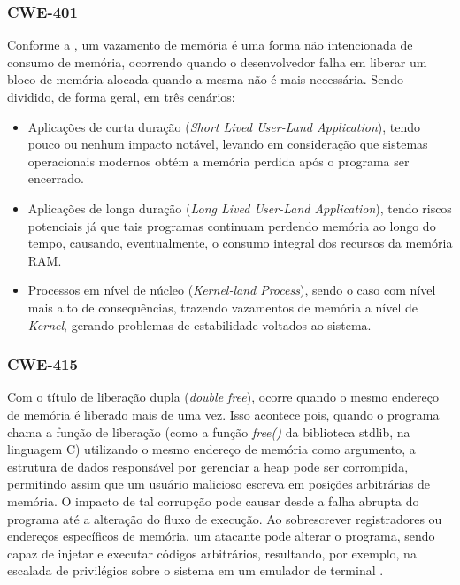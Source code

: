 \documentclass[
    12pt,                %
    openright,           %
    oneside,             %
    a4paper,             %
    english,             %
    brazil               %
]{abntex2}
\begin{document}
\subsubsection{CWE-401}
\label{subsec:cwe401}

Conforme a , um vazamento de memória é uma forma não intencionada de consumo de memória, ocorrendo quando o desenvolvedor falha em liberar um bloco de memória alocada quando a mesma não é mais necessária. Sendo dividido, 
de forma geral, em três cenários:

\begin{itemize}
\item 
Aplicações de curta duração (\textit{Short Lived User-Land Application}), tendo pouco ou nenhum impacto notável, levando em consideração que sistemas operacionais modernos obtém a memória perdida após o programa ser encerrado.
\item
Aplicações de longa duração (\textit{Long Lived User-Land Application}), tendo riscos potenciais já que tais programas continuam perdendo memória ao longo do tempo, causando, eventualmente, o consumo integral dos recursos da memória RAM.
\item 
Processos em nível de núcleo (\textit{Kernel-land Process}), sendo o caso com nível mais alto de consequências, trazendo vazamentos de memória a nível de \textit{Kernel}, gerando problemas de estabilidade voltados ao sistema.
\end{itemize}

\subsubsection{CWE-415}
\label{subsec:cwe415}

Com o título de liberação dupla (\textit{double free}), ocorre quando o mesmo endereço de memória é liberado mais de uma vez. Isso acontece pois, quando o programa chama a função de liberação 
(como a função \textit{free()} da biblioteca stdlib, na linguagem C) utilizando o mesmo endereço de memória como argumento, a estrutura de dados responsável por gerenciar a heap pode ser corrompida, permitindo assim que um 
usuário malicioso escreva em posições arbitrárias de memória. O impacto de tal corrupção pode causar desde a falha abrupta do programa até a alteração do fluxo de execução. 
Ao sobrescrever registradores ou endereços específicos de memória, um atacante pode alterar o programa, sendo capaz de injetar e executar códigos arbitrários, resultando, por exemplo, na escalada de privilégios sobre o sistema em um emulador de terminal \cite{Owasp2026_415}.
\end{document}
